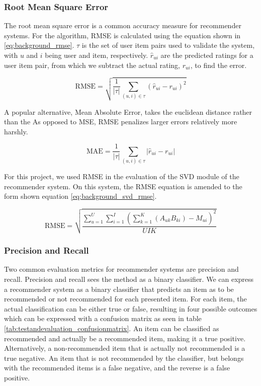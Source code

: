 \subsubsection{Root Mean Square Error}
The root mean square error is a common accuracy measure for recommender systems. For the algorithm, RMSE is calculated using the equation shown in \ref{eq:background_rmse}. $\tau$ is the set of user item pairs used to validate the system, with $u$ and $i$ being user and item, respectively. $\hat{r}_{ui}$ are the predicted ratings for a user item pair, from which we subtract the actual rating, $r_{ui}$, to find the error.

\begin{equation} \label{eq:background_rmse}
\text{RMSE} = \sqrt{\frac{1}{|\tau|}\sum_{(u,i)\in \tau}(\hat{r}_{ui}-r_{ui})^2}
\end{equation}

A popular alternative, Mean Absolute Error, takes the euclidean distance rather than the  As opposed to MSE, RMSE penalizes larger errors relatively more harshly.

\begin{equation} \label{eq:background_mae}
\text{MAE} = \frac{1}{|\tau|}\sum_{(u,i)\in \tau}|\hat{r}_{ui}-r_{ui}|
\end{equation}

For this project, we used RMSE in the evaluation of the SVD module of the recommender system. On this system, the RMSE equation is amended to the form shown equation \ref{eq:background_svd_rmse}.

\begin{equation}\label{eq:background_svd_rmse}
	\text{RMSE} = \sqrt{\frac{\sum_{u=1}^{U}\sum_{i=1}^{I}(\sum_{k=1}^{K}(A_{uk} B_{ki}) - M_{ui})^2}{UIK}}
\end{equation}

\subsubsection{Precision and Recall}
Two common evaluation metrics for recommender systems are precision and recall\cite{recsyshandbook}. Precision and recall sees the method as a binary classifier. We can express a recommender system as a binary classifier that predicts an item as to be recommended or not recommended for each presented item. For each item, the actual classification can be either true or false, resulting in four possible outcomes which can be expressed with a confusion matrix as seen in table \ref{tab:testandevaluation_confusionmatrix}. An item can be classified as recommended and actually be a recommended item, making it a true positive. Alternatively, a non-recommended item that is actually not recommended is a true negative. An item that is not recommended by the classifier, but belongs with the recommended items is a false negative, and the reverse is a false positive.

